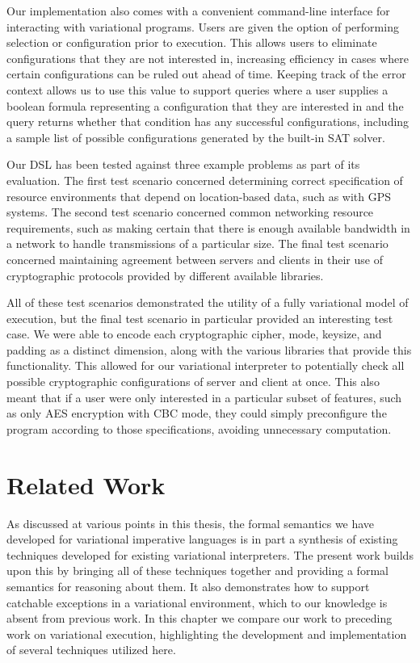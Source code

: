 \documentclass[12pt,oneside]{book}
\begin{document}
Our implementation also
comes with a convenient command-line interface for interacting with variational programs. Users
are given the option of performing selection or configuration prior to execution. This allows users to
eliminate configurations that they are not interested in, increasing efficiency in cases where certain
configurations can be ruled out ahead of time. Keeping track of the error context allows us to use this
value to support queries where a user supplies a boolean formula representing a configuration that they
are interested in and the query returns whether that condition has any successful configurations, including
a sample list of possible configurations generated by the built-in SAT solver.

Our DSL has been tested against three example problems as part of its evaluation. The first test scenario
concerned determining correct specification of resource environments that depend on location-based data,
such as with GPS systems. The second test scenario concerned common networking resource requirements,
such as making certain that there is enough available bandwidth in a network to handle transmissions of a particular
size. The final test scenario concerned maintaining agreement between servers and clients in their use of cryptographic
protocols provided by different available libraries.

All of these test scenarios demonstrated the utility of a fully variational model of execution, but the final test scenario in particular
provided an interesting test case. We were able to encode each cryptographic cipher, mode, keysize, and padding as a distinct
dimension, along with the various libraries that provide this functionality. This allowed for our variational interpreter to potentially check all possible
cryptographic configurations of server and client at once. This also meant that if a user were only interested in a particular subset of features, such as only AES
encryption with CBC mode, they could simply preconfigure the program according to those specifications, avoiding unnecessary
computation.

\chapter{Related Work}
\label{ch:rw}

As discussed at various points in this thesis, the formal semantics we have developed for variational imperative languages
is in part a synthesis of existing techniques developed for existing variational interpreters. The present work builds upon this
by bringing all of these techniques together and providing a formal semantics for reasoning about them. It also demonstrates
how to support catchable exceptions in a variational environment, which to our knowledge is absent from previous work.
In this chapter we compare our work to preceding work on variational execution, highlighting the development and implementation
of several techniques utilized here.
\end{document}
